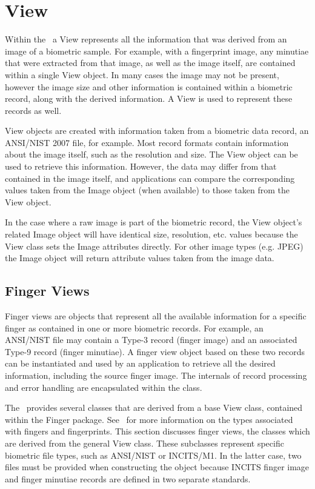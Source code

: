 %
%
\chapter{View}
\label{chp-view}
Within the \lname\ a View represents all the information that was derived from
an image of a biometric sample. For example, with a fingerprint image, any
minutiae that were extracted from that image, as well as the image itself,
are contained within a single View object. In many cases the image may not
be present, however the image size and other information is contained within
a biometric record, along with the derived information. A View is used to
represent these records as well.

View objects are created with information taken from a biometric data record,
an ANSI/NIST 2007 file, for example. Most record formats contain information
about the image itself, such as the resolution and size. The View object can
be used to retrieve this information. However, the data may differ from that
contained in the image itself, and applications can compare the corresponding
values taken from the Image object (when available) to those taken from the
View object.

In the case where a raw image is part of the biometric record, the View object's
related Image object will have identical size, resolution, etc. values because
the View class sets the Image attributes directly. For other image types
(e.g. JPEG) the Image object will return attribute values taken from the image
data.

\section{Finger Views}
\label{sec-fingerviews}

Finger views are objects that represent all the available information for a
specific finger as contained in one or more biometric records. For example,
an ANSI/NIST file may contain a Type-3 record (finger image) and an associated
Type-9 record (finger minutiae). A finger view object based on these two
records can be instantiated and used by an application to retrieve all the
desired information, including the source finger image. The internals of
record processing and error handling are encapsulated within the class.

The \sname\ provides several classes that are derived from a base View class,
contained within the Finger package. See~ for more
information
on the types associated with fingers and fingerprints. This section discusses
finger views, the classes which are derived from the general View class.
These subclasses represent specific biometric file types, such as ANSI/NIST
or INCITS/M1. In the latter case, two files must be provided when constructing
the object because INCITS finger image and finger minutiae records are defined
in two separate standards.

